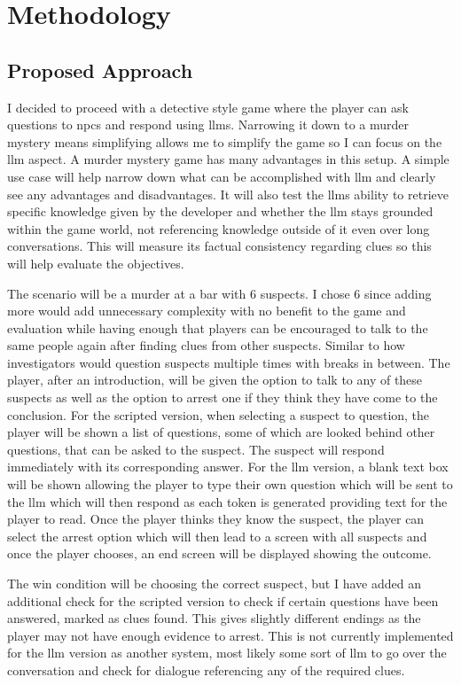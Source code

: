 \documentclass[12pt, a4paper]{report}
\begin{document}
	\chapter{Methodology}
	\section{Proposed Approach}
	\label{section:proposedapproach}
	I decided to proceed with a detective style game where the player can ask questions to \gls{npc}s and respond using \gls{llm}s. Narrowing it down to a murder mystery means simplifying allows me to simplify the game so I can focus on the \gls{llm} aspect. A murder mystery game has many advantages in this setup. A simple use case will help narrow down what can be accomplished with \gls{llm} and clearly see any advantages and disadvantages. It will also test the \gls{llm}s ability to retrieve specific knowledge given by the developer and whether the \gls{llm} stays grounded within the game world, not referencing knowledge outside of it even over long conversations. This will measure its factual consistency regarding clues so this will help evaluate the objectives.
	
	The scenario will be a murder at a bar with 6 suspects. I chose 6 since adding more would add unnecessary complexity with no benefit to the game and evaluation while having enough that players can be encouraged to talk to the same people again after finding clues from other suspects. Similar to how investigators would question suspects multiple times with breaks in between. The player, after an introduction, will be given the option to talk to any of these suspects as well as the option to arrest one if they think they have come to the conclusion. For the scripted version, when selecting a suspect to question, the player will be shown a list of questions, some of which are looked behind other questions, that can be asked to the suspect. The suspect will respond immediately with its corresponding answer. For the \gls{llm} version, a blank text box will be shown allowing the player to type their own question which will be sent to the \gls{llm} which will then respond as each token is generated providing text for the player to read. Once the player thinks they know the suspect, the player can select the arrest option which will then lead to a screen with all suspects and once the player chooses, an end screen will be displayed showing the outcome.
	
	The win condition will be choosing the correct suspect, but I have added an additional check for the scripted version to check if certain questions have been answered,  marked as clues found. This gives slightly different endings as the player may not have enough evidence to arrest. This is not currently implemented for the \gls{llm} version as another system, most likely some sort of \gls{llm} to go over the conversation and check for dialogue referencing any of the required clues.
	
\end{document}
